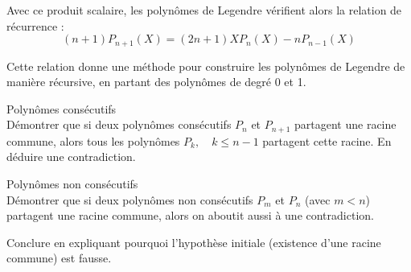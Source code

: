\documentclass[10pt,a4paper]{article}
\begin{document}
Avec ce produit scalaire, les polynômes de Legendre vérifient alors la relation de récurrence :
\[
(n+1) P_{n+1}(X) = (2n+1) X P_n(X) - n P_{n-1}(X)
\]

Cette relation donne une méthode pour construire les polynômes de Legendre de manière récursive, en
partant des polynômes de degré 0 et 1.

\q Polynômes consécutifs\\
Démontrer que si deux polynômes consécutifs $ P_n $ et $ P_{n+1} $ partagent une racine
commune, alors tous les polynômes $ P_k , \quad k \leq n-1 $ partagent cette racine.
En déduire une contradiction.

\q Polynômes non consécutifs\\
Démontrer que si deux polynômes non consécutifs $ P_m $ et $ P_n $ (avec $m < n$) partagent une
racine commune, alors on aboutit aussi à une contradiction.

\q Conclure en expliquant pourquoi l'hypothèse initiale (existence d'une racine commune) est fausse.
\end{document}
